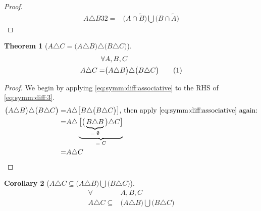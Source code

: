 \documentclass[]{article}
\newcommand\numberthis{\addtocounter{equation}{1}\tag{\theequation}}
\newcommand{\stcomp}[1]{\widetilde{#1}}
\newtheorem{thm}{Theorem}
\newtheorem{cor}[thm]{Corollary}
\begin{document}
\begin{appendices}
\begin{proof}
		\begin{align*}
					A \triangle B 32=& \big(A \cap \stcomp{B}\big) \bigcup \big(B \cap \stcomp{A}\big)
		\end{align*}
	\end{proof}
	\begin{thm}[$	A \triangle C =\big(A\triangle B\big) \triangle \big(B\triangle C\big)$]
		\begin{align*}
			\forall& A,B,C\\
			A \triangle C =& \big(A\triangle B\big) \triangle \big(B\triangle C\big) \numberthis \label{eq:symm:diff:3}
		\end{align*}
	\end{thm}
	\begin{proof}
		We begin by applying \eqref{eq:symm:diff:associative} to the RHS of \eqref{eq:symm:diff:3}.
		\begin{align*}
			\big(A\triangle B\big) \triangle \big(B\triangle C\big) =& A \triangle \big[B \triangle \big(B\triangle C\big)\big] \text{, then apply \eqref{eq:symm:diff:associative} again:}\\
			=& A \triangle \underbrace{\big[\big(\underbrace{B \triangle B}_\text{$=\emptyset$}\big)\triangle C\big]}_\text{$=C$}\\
			=&A \triangle C
		\end{align*}
	\end{proof}
	\begin{cor}[$A \triangle C \subseteq \big(A\triangle B\big) \bigcup \big(B\triangle C\big)$]
			\begin{align*}
			\forall& A,B,C\\
			A \triangle C \subseteq& \big(A\triangle B\big) \bigcup \big(B\triangle C\big)
		\end{align*}
	\end{cor}
\end{appendices}

\printglossaries




\end{document}
